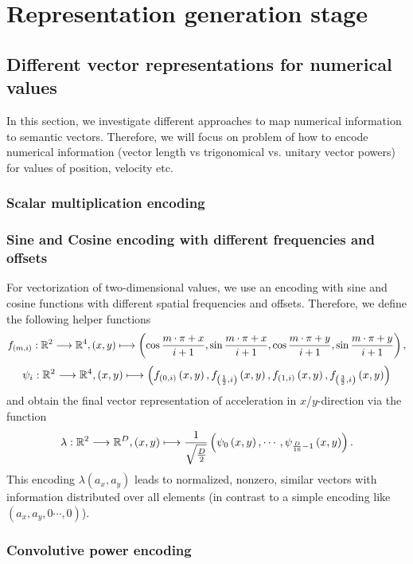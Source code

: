 \section{Representation generation stage}%
\label{sec:representation_generation_stage}


\subsection{Different vector representations for numerical values}%
\label{subsec:different_vector_representations_for_numerical_values}


In this section, we investigate different approaches to map numerical information to semantic vectors.
Therefore, we will focus on
problem of how to encode numerical information (vector length vs trigonomical vs. unitary vector powers) for values of position, velocity etc.
\subsubsection{Scalar multiplication encoding}
\subsubsection{Sine and Cosine encoding with different frequencies and offsets}
For vectorization of two-dimensional values, we use an encoding with sine and cosine functions with different spatial frequencies and offsets.
Therefore, we define the following helper functions
\[ f_{\left(m,i\right)}: \mathbb{R}^2 \longrightarrow \mathbb{R}^4, \left(x,y\right) \longmapsto \left(\cos\frac{m\cdot \pi + x}{i + 1}, \sin\frac{m\cdot \pi + x}{i + 1}, \cos\frac{m\cdot \pi + y}{i + 1}, \sin\frac{m\cdot \pi + y}{i + 1}\right),
\]
\[
\psi_i: \mathbb{R}^2 \longrightarrow \mathbb{R}^4, \left(x,y\right) \longmapsto \left(f_{\left(0,i\right)}\left(x,y\right), f_{\left(\frac{1}{2},i\right)}\left(x,y\right), f_{\left(1,i\right)}\left(x,y\right), f_{\left(\frac{3}{2},i\right)}\left(x,y\right)\right)
\]
and obtain the final vector representation of acceleration in $x$/$y$-direction via the function
\[
\lambda: \mathbb{R}^2 \longrightarrow \mathbb{R}^D, \left(x,y\right) \longmapsto \frac{1}{\sqrt{\frac{D}{2}}}\left(\psi_0\left(x,y\right), \cdots, \psi_{\frac{D}{16}-1}\left(x,y\right)\right).
\]
This encoding $\lambda\left(a_x, a_y\right)$ leads to normalized, nonzero, similar vectors with information distributed over all elements (in contrast to a simple encoding like $\left(a_x, a_y, 0 \cdots, 0\right)$).
\subsubsection{Convolutive power encoding}

